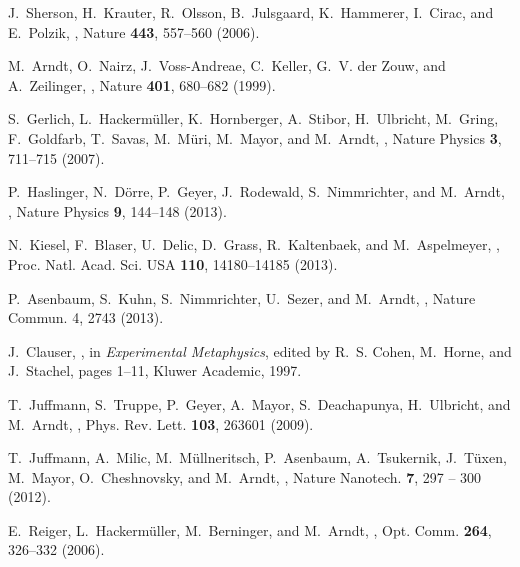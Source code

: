 \documentclass[12pt]{article}
\begin{document}
\begin{thebibliography}{100}
J.~Sherson, H.~Krauter, R.~Olsson, B.~Julsgaard, K.~Hammerer, I.~Cirac, and
  E.~Polzik,
,
\newblock Nature {\bf 443}, 557--560 (2006).

M.~Arndt, O.~Nairz, J.~Voss-Andreae, C.~Keller, G.~V. der Zouw, and
  A.~Zeilinger,
,
\newblock Nature {\bf 401}, 680--682 (1999).

S.~Gerlich, L.~Hackermüller, K.~Hornberger, A.~Stibor, H.~Ulbricht, M.~Gring,
  F.~Goldfarb, T.~Savas, M.~Müri, M.~Mayor, and M.~Arndt,
,
\newblock Nature Physics {\bf 3}, 711--715 (2007).

P.~Haslinger, N.~Dörre, P.~Geyer, J.~Rodewald, S.~Nimmrichter, and M.~Arndt,
,
\newblock Nature Physics {\bf 9}, 144–148 (2013).

N.~Kiesel, F.~Blaser, U.~Delic, D.~Grass, R.~Kaltenbaek, and M.~Aspelmeyer,
,
\newblock Proc. Natl. Acad. Sci. USA {\bf 110}, 14180–14185 (2013).

P.~Asenbaum, S.~Kuhn, S.~Nimmrichter, U.~Sezer, and M.~Arndt,
,
\newblock Nature Commun. 4, 2743 (2013).

J.~Clauser,
,
\newblock in {\em Experimental Metaphysics}, edited by R.~S. Cohen, M.~Horne,
  and J.~Stachel, pages 1--11, Kluwer Academic, 1997.

T.~Juffmann, S.~Truppe, P.~Geyer, A.~Mayor, S.~Deachapunya, H.~Ulbricht, and
  M.~Arndt,
,
\newblock Phys. Rev. Lett. {\bf 103}, 263601 (2009).

T.~Juffmann, A.~Milic, M.~Müllneritsch, P.~Asenbaum, A.~Tsukernik, J.~Tüxen,
  M.~Mayor, O.~Cheshnovsky, and M.~Arndt,
,
\newblock Nature Nanotech. {\bf 7}, 297 -- 300 (2012).

E.~Reiger, L.~Hackerm{\"u}ller, M.~Berninger, and M.~Arndt,
,
\newblock Opt. Comm. {\bf 264}, 326--332 (2006).


\end{thebibliography}
\end{document}
